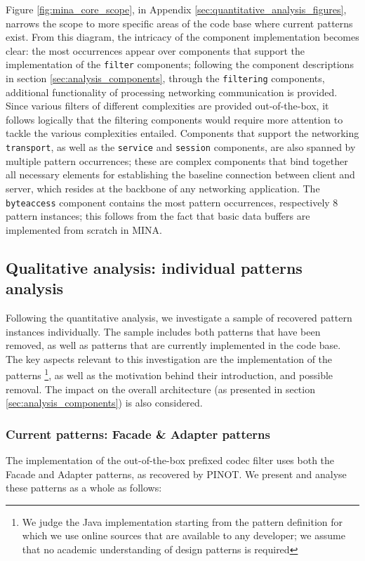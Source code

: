 Figure \ref{fig:mina_core_scope}, in Appendix \ref{sec:quantitative_analysis_figures}, narrows the scope to more specific areas of the code base where current patterns exist. From this diagram, the intricacy of the component implementation becomes clear: the most occurrences appear over components that support the implementation of the \texttt{filter} components; following the component descriptions in section \ref{sec:analysis_components}, through the \texttt{filtering} components,  additional functionality of processing networking communication is provided. Since various filters of different complexities are provided out-of-the-box, it follows logically that the filtering components would require more attention to tackle the various complexities entailed. Components that support the networking \texttt{transport}, as well as the \texttt{service} and \texttt{session} components, are also spanned by multiple pattern occurrences; these are complex components that bind together all necessary elements for establishing the baseline connection between client and server, which resides at the backbone of any networking application. The \texttt{byteaccess} component contains the most pattern occurrences, respectively 8 pattern instances; this follows from the fact that basic data buffers are implemented from scratch in MINA.

\subsection{Qualitative analysis: individual patterns analysis}
\label{sec:qualitative_analysis}
Following the quantitative analysis, we investigate a sample of recovered pattern instances individually. The sample includes both patterns that have been removed, as well as patterns that are currently implemented in the code base. The key aspects relevant to this investigation are the implementation of the patterns \footnote{We judge the Java implementation starting from the pattern definition for which we use online sources that are available to any developer; we assume that no academic understanding of design patterns is required}, as well as the motivation behind their introduction, and possible removal. The impact on the overall architecture (as presented in section \ref{sec:analysis_components}) is also considered.

\subsubsection{Current patterns: Facade \& Adapter patterns}
\label{sec:current_facade_adapter}
The implementation of the out-of-the-box prefixed codec filter uses both the Facade and Adapter patterns, as recovered by PINOT. We present and analyse these patterns as a whole as follows:


